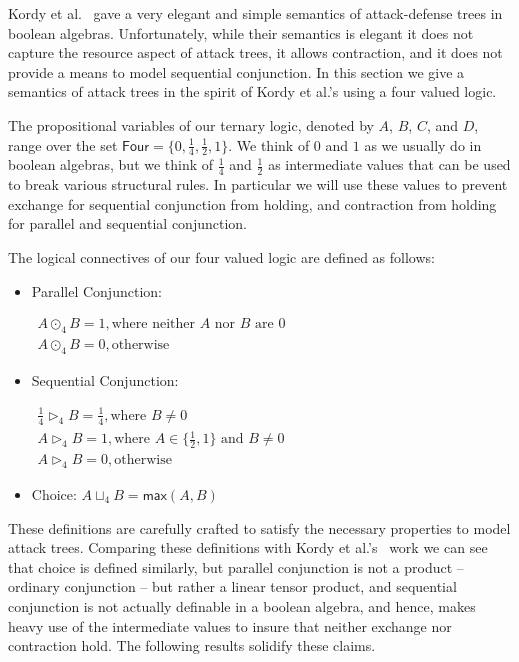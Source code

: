 \newcommand{\forth}{\frac{1}{4}}
\newcommand{\half}{\frac{1}{2}}

Kordy et al.~\cite{Kordy:2012} gave a very elegant and simple
semantics of attack-defense trees in boolean algebras.  Unfortunately,
while their semantics is elegant it does not capture the resource
aspect of attack trees, it allows contraction, and it does not provide
a means to model sequential conjunction.  In this section we give a
semantics of attack trees in the spirit of Kordy et al.'s using a four
valued logic.

The propositional variables of our ternary logic, denoted by $A$, $B$,
$C$, and $D$, range over the set $\mathsf{Four} = \{0, \forth, \half,
1\}$.  We think of $0$ and $1$ as we usually do in boolean algebras,
but we think of $\forth$ and $\half$ as intermediate values that can
be used to break various structural rules.  In particular we will use
these values to prevent exchange for sequential conjunction from
holding, and contraction from holding for parallel and sequential
conjunction.
\begin{definition}
  \label{def:logical-connectives}
  The logical connectives of our four valued logic are defined as
  follows:
  \begin{itemize}
  \item[] Parallel Conjunction:
    \begin{center}
      \begin{math}
        \begin{array}{lll}
          A \odot_4 B = 1, \text{where neither $A$ nor $B$ are $0$}\\
          A \odot_4 B = 0, \text{otherwise}
        \end{array}
      \end{math}
    \end{center}
  \item[] Sequential Conjunction:
    \begin{center}
      \begin{math}
        \begin{array}{lll}
          \forth \rhd_4 B = \forth, \text{where $B \neq 0$}\\[2px]         
          A \rhd_4 B = 1, \text{where } A \in \{\half, 1\} \text{ and } B \neq 0\\
          A \rhd_4 B = 0, \text{otherwise}
        \end{array}
      \end{math}
    \end{center}
  \item[] Choice: $A \sqcup_4 B = \mathsf{max}(A,B)$    
  \end{itemize}
\end{definition}
These definitions are carefully crafted to satisfy the necessary
properties to model attack trees.  Comparing these definitions with
Kordy et al.'s~\cite{Kordy:2012} work we can see that choice is
defined similarly, but parallel conjunction is not a product --
ordinary conjunction -- but rather a linear tensor product, and
sequential conjunction is not actually definable in a boolean algebra,
and hence, makes heavy use of the intermediate values to insure that
neither exchange nor contraction hold.  The following results solidify
these claims.

